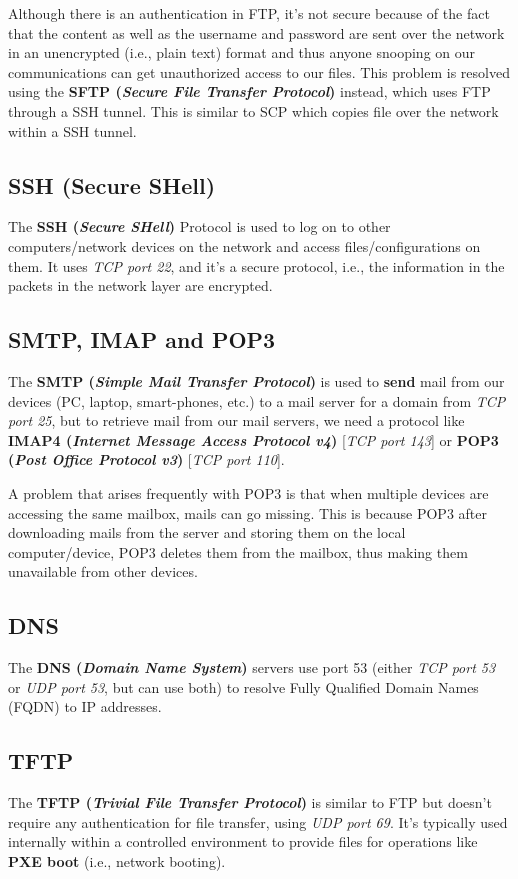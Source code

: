 Although there is an authentication in FTP, it's not secure because of the fact that the content as well as the username and password are sent over the network in an unencrypted (i.e., plain text) format and thus anyone snooping on our communications can get unauthorized access to our files. This problem is resolved using the \textbf{SFTP (\textit{Secure File Transfer Protocol})} instead, which uses FTP through a SSH tunnel. This is similar to SCP which copies file over the network within a SSH tunnel. 

\subsection{SSH (Secure SHell)}
The \textbf{SSH (\textit{Secure SHell})} Protocol is used to log on to other computers/network devices on the network and access files/configurations on them. It uses \textit{TCP port 22}, and it's a secure protocol, i.e., the information in the packets in the network layer are encrypted. 

\subsection{SMTP, IMAP and POP3}
The \textbf{SMTP (\textit{Simple Mail Transfer Protocol})} is used to \textbf{send} mail from our devices (PC, laptop, smart-phones, etc.) to a mail server for a domain from \textit{TCP port 25}, but to retrieve mail from our mail servers, we need a protocol like \textbf{IMAP4 (\textit{Internet Message Access Protocol v4})} [\textit{TCP port 143}] or \textbf{POP3 (\textit{Post Office Protocol v3})} [\textit{TCP port 110}]. 

A problem that arises frequently with POP3 is that when multiple devices are accessing the same mailbox, mails can go missing. This is because POP3 after downloading mails from the server and storing them on the local computer/device, POP3 deletes them from the mailbox, thus making them unavailable from other devices. 

\subsection{DNS}
The \textbf{DNS (\textit{Domain Name System})} servers use port 53 (either \textit{TCP port 53} or \textit{UDP port 53}, but can use both) to resolve Fully Qualified Domain Names (FQDN) to IP addresses. 

\subsection{TFTP}
The \textbf{TFTP (\textit{Trivial File Transfer Protocol})} is similar to FTP but doesn't require any authentication for file transfer, using \textit{UDP port 69}. It's typically used internally within a controlled environment to provide files for operations like \textbf{PXE boot} (i.e., network booting). 

